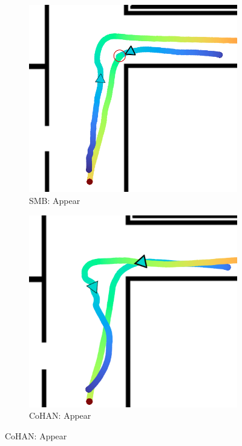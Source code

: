 \begin{figure}[h!]
\begin{subfigure}{.45\columnwidth}
  \includegraphics[width=\textwidth]{images/chapter6/smb/appear2.png}
  \caption{SMB: Appear}
\end{subfigure}
\hspace{0.15cm}
\begin{subfigure}{.45\columnwidth}
  \includegraphics[width=\textwidth]{images/chapter6/cohan/appear.png}
  \caption{CoHAN: Appear}

\end{subfigure}
\end{figure}
